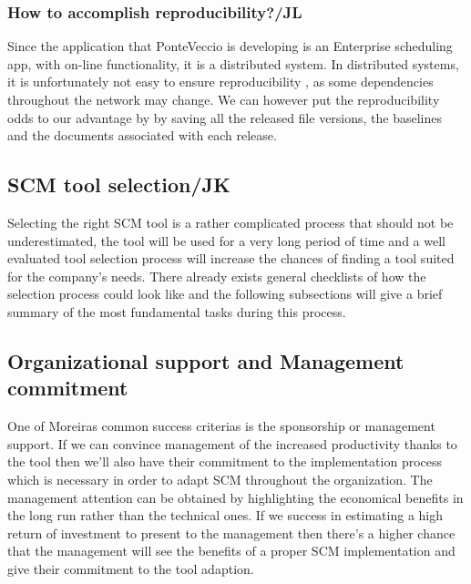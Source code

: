 \documentclass[10pt]{article}
\begin{document}
\subsubsection{How to accomplish reproducibility?/JL}
\noindent Since the application that PonteVeccio is developing is an Enterprise scheduling app, with on-line functionality, it is a distributed system. In distributed systems, it is unfortunately not easy to ensure reproducibility \cite{Bays}, as some dependencies throughout the network may change. We can however put the reproducibility odds to our advantage by by saving all the released file versions, the baselines and the documents associated with each release. 

\subsection{SCM tool selection/JK}
Selecting the right SCM tool is a rather complicated process that should not be underestimated, the tool will be used for a very long period of time and a well evaluated tool selection process will increase the chances of finding a tool suited for the company's needs. There already exists general checklists of how the selection process could look like and the following subsections will give a brief summary of the most fundamental tasks during this process.

\subsection{Organizational support and Management commitment}
One of Moreiras \cite{Moreira} common success criterias is the sponsorship or management support. If we can convince management of the increased productivity thanks to the tool then we'll also have their commitment to the implementation process which is necessary in order to adapt SCM throughout the organization. The management attention can be obtained by highlighting the economical benefits in the long run rather than the technical ones. If we success in estimating a high return of investment to present to the management then there's a higher chance that the management will see the benefits of a proper SCM implementation and give their commitment to the tool adaption. 
\end{document}
